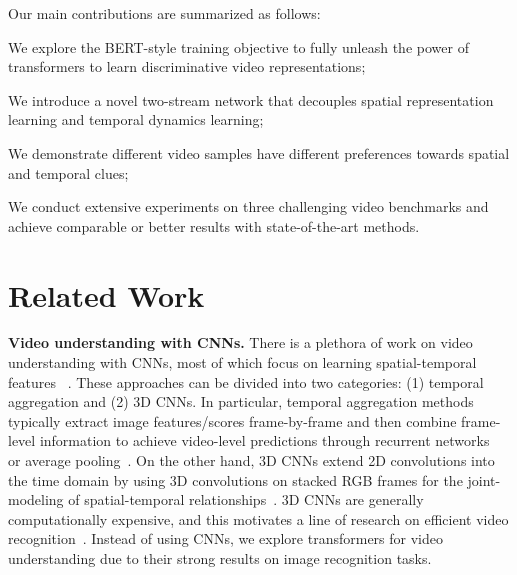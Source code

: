 \documentclass[10pt,twocolumn,letterpaper]{article}
\begin{document}
Our main contributions are summarized as follows:
\begin{enumerate*}[label=(\arabic*)]
    \item We explore the BERT-style training  objective to fully unleash the power of transformers to learn discriminative video representations;
    \item We introduce a novel two-stream network that decouples spatial representation learning and temporal dynamics learning; 
    \item We demonstrate different video samples have different preferences towards spatial and temporal clues;
    \item We conduct extensive experiments on three challenging video benchmarks and achieve comparable or better results with state-of-the-art methods. 
\end{enumerate*}

\section{Related Work}
\label{sec:relawork}
\noindent \textbf{Video understanding with CNNs.} There is a plethora of work on video understanding with CNNs, most of which focus on learning spatial-temporal features ~\cite{quovadis,c3d,r21d,slowfast,x3d,tsn,tsm}. These approaches can be divided into two categories: (1) temporal aggregation and (2) 3D CNNs. In particular, temporal aggregation methods typically extract image features/scores frame-by-frame and then combine frame-level information to achieve video-level predictions through recurrent networks~\cite{recurrentdonahue,recurrentjoe} or average pooling~\cite{twostream,tsn}.  On the other hand, 3D CNNs extend 2D convolutions into the time domain by using 3D convolutions on stacked RGB frames for the joint-modeling of spatial-temporal relationships~\cite{quovadis,c3d,r21d,slowfast,x3d}. 3D CNNs are generally computationally expensive, and this motivates a line of research on efficient video recognition~\cite{eco,multifiber,r21d,x3d,trn,tsm,channelseparated}.  Instead of using CNNs, we explore transformers for video understanding due to their strong results on image recognition tasks.
\end{document}
